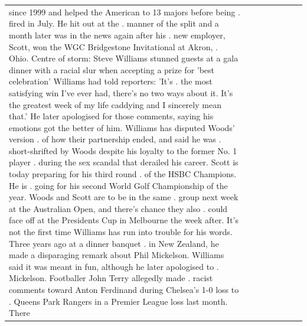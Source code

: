 \begin{table}[H]
\begin{tabular}{llrlllll}
since 1999 and helped the American to 13 majors before being . fired in July. He hit out at the . manner of the split and a month later was in the news again after his . new employer, Scott, won the WGC Bridgestone Invitational at Akron, . Ohio. Centre of storm: Steve Williams stunned guests at a gala dinner with a racial slur when accepting a prize for 'best celebration' Williams had told reporters: 'It's . the most satisfying win I've ever had, there's no two ways about it. It's the greatest week of my life caddying and I sincerely mean that.' He later apologised for those comments, saying his emotions got the better of him. Williams has disputed Woods' version . of how their partnership ended, and said he was . short-shrifted by Woods despite his loyalty to the former No. 1 player . during the sex scandal that derailed his career. Scott is today preparing for his third round . of the HSBC Champions. He is . going for his second World Golf Championship of the year. Woods and Scott are to be in the same . group next week at the Australian Open, and there's chance they also . could face off at the Presidents Cup in Melbourne the week after. It's not the first time Williams has run into trouble for his words. Three years ago at a dinner banquet . in New Zealand, he made a disparaging remark about Phil Mickelson. Williams said it was meant in fun, although he later apologised to . Mickelson. Footballer John Terry allegedly made . racist comments toward Anton Ferdinand during Chelsea's 1-0 loss to . Queens Park Rangers in a Premier League loss last month. There \\

\end{tabular}
\end{table}
